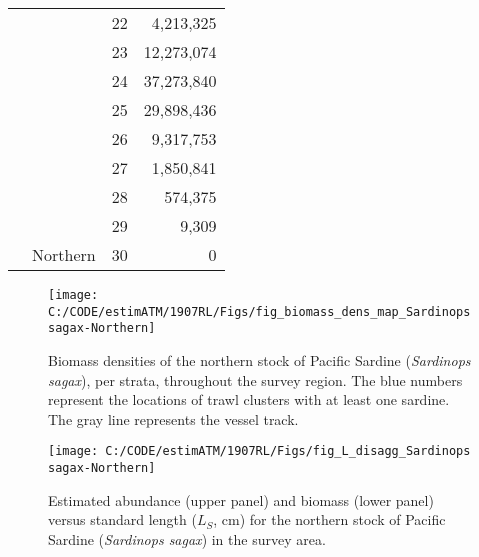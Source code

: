 \documentclass[]{article}
\begin{document}
\begin{longtable}{>{\em}l|l|r|r}
\cline{3-4}
 &  & 22 & 4,213,325\\
\cline{3-4}
\rowcolor{gray!6}   &  & 23 & 12,273,074\\
\cline{3-4}
 &  & 24 & 37,273,840\\
\cline{3-4}
\rowcolor{gray!6}   &  & 25 & 29,898,436\\
\cline{3-4}
 &  & 26 & 9,317,753\\
\cline{3-4}
\rowcolor{gray!6}   &  & 27 & 1,850,841\\
\cline{3-4}
 &  & 28 & 574,375\\
\cline{3-4}
\rowcolor{gray!6}   &  & 29 & 9,309\\
\cline{3-4}
\multirow{-30}{*}{\raggedright\arraybackslash Sardinops sagax} & \multirow{-30}{*}{\raggedright\arraybackslash Northern} & 30 & 0\\
\hline
\end{longtable}

\newpage



\newpage



\begin{figure}[H]

{\centering \texttt{[image: C:/CODE/estimATM/1907RL/Figs/fig\_biomass\_dens\_map\_Sardinops sagax-Northern]} 

}

\caption{Biomass densities of the northern stock of Pacific Sardine (\emph{Sardinops sagax}), per strata, throughout the survey region. The blue numbers represent the locations of trawl clusters with at least one sardine. The gray line represents the vessel track.}\label{fig:biom-dens-sar-n}
\end{figure}

\newpage



\begin{figure}[H]

{\centering \texttt{[image: C:/CODE/estimATM/1907RL/Figs/fig\_L\_disagg\_Sardinops sagax-Northern]} 

}

\caption{Estimated abundance (upper panel) and biomass (lower panel) versus standard length (\(L_S\), cm) for the northern stock of Pacific Sardine (\emph{Sardinops sagax}) in the survey area.}\label{fig:l-disagg-sar-n}
\end{figure}

\newpage
\end{document}
